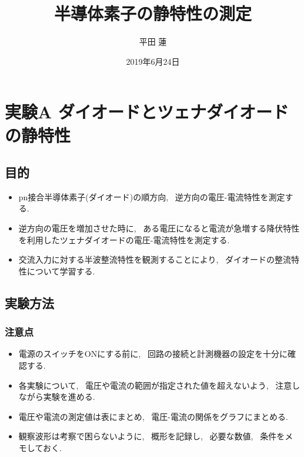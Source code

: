 \documentclass[uplatex,dvipdfmx,a4paper,js=standard, titlepage]{bxjsarticle}
\title{半導体素子の静特性の測定}
\author{平田 蓮}
\date{2019年6月24日}
\begin{document}
\maketitle
\section{実験A ダイオードとツェナダイオードの静特性}
    \subsection{目的}
        \begin{itemize}
            \item pn接合半導体素子(ダイオード)の順方向, ~逆方向の電圧-電流特性を測定する.
            \item 逆方向の電圧を増加させた時に,
                ~ある電圧になると電流が急増する降伏特性を利用したツェナダイオードの電圧-電流特性を測定する.
            \item 交流入力に対する半波整流特性を観測することにより,
                ~ダイオードの整流特性について学習する.
        \end{itemize}
    \subsection{実験方法}
        \subsubsection{注意点}
            \begin{itemize}
                \item 電源のスイッチをONにする前に, ~回路の接続と計測機器の設定を十分に確認する.
                \item 各実験について, ~電圧や電流の範囲が指定された値を超えないよう,
                    ~注意しながら実験を進める.
                \item 電圧や電流の測定値は表にまとめ, ~電圧-電流の関係をグラフにまとめる.
                \item 観察波形は考察で困らないように, ~概形を記録し, ~必要な数値, ~条件をメモしておく.
            \end{itemize}
\end{document}
